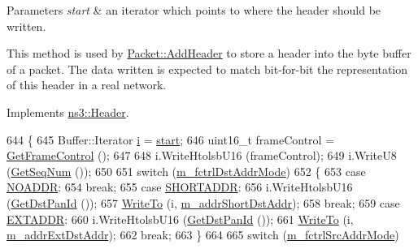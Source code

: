 \begin{DoxyParams}{Parameters}
{\em start} & an iterator which points to where the header should be written.\\
\hline
\end{DoxyParams}
This method is used by \hyperlink{classns3_1_1Packet_a465108c595a0bc592095cbcab1832ed8}{Packet\+::\+Add\+Header} to store a header into the byte buffer of a packet. The data written is expected to match bit-\/for-\/bit the representation of this header in a real network. 

Implements \hyperlink{classns3_1_1Header_afb61f1aac69ff8349a6bfe521fab5404}{ns3\+::\+Header}.


\begin{DoxyCode}
644 \{
645   Buffer::Iterator \hyperlink{bernuolliDistribution_8m_a6f6ccfcf58b31cb6412107d9d5281426}{i} = \hyperlink{namespacevisualizer_1_1core_a2a35e5d8a34af358b508dac8635754e0}{start};
646   uint16\_t frameControl = \hyperlink{classns3_1_1LrWpanMacHeader_a9d63cb5defe8f26f6a02062c31d9608b}{GetFrameControl} ();
647 
648   i.WriteHtolsbU16 (frameControl);
649   i.WriteU8 (\hyperlink{classns3_1_1LrWpanMacHeader_af28fab1c806434e0a677982507eab69d}{GetSeqNum} ());
650 
651   \textcolor{keywordflow}{switch} (\hyperlink{classns3_1_1LrWpanMacHeader_a02618462ab859dbb5cacffb93c73a209}{m\_fctrlDstAddrMode})
652     \{
653     \textcolor{keywordflow}{case} \hyperlink{classns3_1_1LrWpanMacHeader_a98e60673830540d040ee9db3a93096bda4e7971609a9fb4adf567f7cc6c87798e}{NOADDR}:
654       \textcolor{keywordflow}{break};
655     \textcolor{keywordflow}{case} \hyperlink{classns3_1_1LrWpanMacHeader_a98e60673830540d040ee9db3a93096bda62b2ffee1b7c2b3b6205cbfbd34c2072}{SHORTADDR}:
656       i.WriteHtolsbU16 (\hyperlink{classns3_1_1LrWpanMacHeader_a0a315dd05f63b5d640a854b6378c34f4}{GetDstPanId} ());
657       \hyperlink{namespacens3_abe3cb0173e87a3f7e2e414358c0a08bf}{WriteTo} (i, \hyperlink{classns3_1_1LrWpanMacHeader_ad658b952ffd2fd613da45c0852443ad9}{m\_addrShortDstAddr});
658       \textcolor{keywordflow}{break};
659     \textcolor{keywordflow}{case} \hyperlink{classns3_1_1LrWpanMacHeader_a98e60673830540d040ee9db3a93096bda9d278e36bffa9063b5c24b6ed6aa0262}{EXTADDR}:
660       i.WriteHtolsbU16 (\hyperlink{classns3_1_1LrWpanMacHeader_a0a315dd05f63b5d640a854b6378c34f4}{GetDstPanId} ());
661       \hyperlink{namespacens3_abe3cb0173e87a3f7e2e414358c0a08bf}{WriteTo} (i, \hyperlink{classns3_1_1LrWpanMacHeader_ad0a80303ece007cedbbd6c47db476304}{m\_addrExtDstAddr});
662       \textcolor{keywordflow}{break};
663     \}
664 
665   \textcolor{keywordflow}{switch} (\hyperlink{classns3_1_1LrWpanMacHeader_a73a10a3c6b5bacfd52fcde03bb62bba5}{m\_fctrlSrcAddrMode})

\end{DoxyCode}
